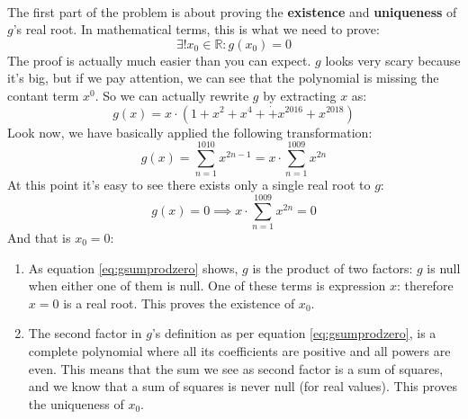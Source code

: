\paragraph{}
The first part of the problem is about proving the \textbf{existence} and \textbf{uniqueness}
of $g$'s real root. In mathematical terms, this is what we need to prove:
\begin{equation*}
    \exists! x_0 \in \mathbb{R} : g(x_0) = 0
\end{equation*}
The proof is actually much easier than you can expect. $g$ looks very scary because it's big,
but if we pay attention, we can see that the polynomial is missing the contant term $x^0$.
So we can actually rewrite $g$ by extracting $x$ as:
\begin{equation*}
    g(x) = x \cdot \left(1 + x^2 + x^4 + \dot + x^{2016} + x^{2018} \right)
\end{equation*}
Look now, we have basically applied the following transformation:
\begin{equation*}
    g(x) = \sum_{n = 1}^{1010} x^{2n-1} = x \cdot \sum_{n = 1}^{1009} x^{2n} 
\end{equation*}
At this point it's easy to see there exists only a single real root to $g$:
\begin{equation}\label{eq:gsumprodzero}
    g(x) = 0 \implies x \cdot \sum_{n = 1}^{1009} x^{2n} = 0
\end{equation}
And that is $x_0 = 0$:
\begin{enumerate}
    \item As equation \ref{eq:gsumprodzero} shows, $g$ is the product of two factors: $g$ is
        null when either one of them is null. One of these terms is expression $x$:
        therefore $x = 0$ is a real root. This proves the existence of $x_0$.
    \item The second factor in $g$'s definition as per equation \ref{eq:gsumprodzero},
        is a complete polynomial where all its coefficients are positive and all powers
        are even.
        This means that the sum we see as second factor is a sum of squares, and
        we know that a sum of squares is never null (for real values). This proves the uniqueness
        of $x_0$.
\end{enumerate}

